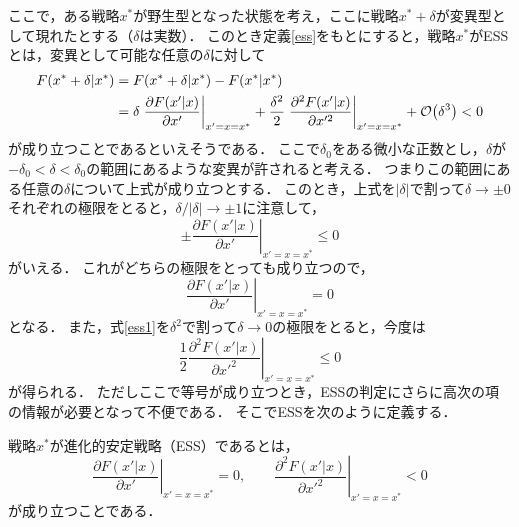 ここで，ある戦略$x^*$が野生型となった状態を考え，ここに戦略$x^*+\delta$が変異型として現れたとする（$\delta$は実数）．
このとき定義\ref{ess}をもとにすると，戦略$x^*$がESSとは，変異として可能な任意の$\delta$に対して
\begin{align}
  F(x^*+\delta|x^*) &= F(x^*+\delta | x^*) - F(x^*|x^*) \notag\\
  &= \delta\left.\frac{\partial F(x'|x)}{\partial x'}\right|_{x'=x=x^*} + \frac{\delta^2}{2}\left.\frac{\partial^2 F(x'|x)}{\partial x'^2}\right|_{x'=x=x^*} + \order{\delta^3} < 0 \label{ess1}
\end{align}
が成り立つことであるといえそうである．
ここで$\delta_0$をある微小な正数とし，$\delta$が$-\delta_0 < \delta < \delta_0$の範囲にあるような変異が許されると考える．
つまりこの範囲にある任意の$\delta$について上式が成り立つとする．
このとき，上式を$\lvert \delta \rvert$で割って$\delta \to \pm 0$それぞれの極限をとると，$\delta/\lvert\delta\rvert \to \pm 1$に注意して，
\begin{equation}
  \pm \left.\frac{\partial F(x'|x)}{\partial x'}\right|_{x'=x=x^*} \le 0 
\end{equation}
がいえる．
これがどちらの極限をとっても成り立つので，
\begin{equation}
  \left.\frac{\partial F(x'|x)}{\partial x'}\right|_{x'=x=x^*} = 0
\end{equation}
となる．
また，式\eqref{ess1}を$\delta^2$で割って$\delta \to 0$の極限をとると，今度は
\begin{equation}
  \frac{1}{2}\left.\frac{\partial^2 F(x'|x)}{\partial x'^2}\right|_{x'=x=x^*} \le 0
\end{equation}
が得られる．
ただしここで等号が成り立つとき，ESSの判定にさらに高次の項の情報が必要となって不便である．
そこでESSを次のように定義する．
\begin{dfn}[漸進進化における進化的安定戦略]
  戦略$x^*$が進化的安定戦略（ESS）であるとは，
  \begin{equation}
    \left.\frac{\partial F(x'|x)}{\partial x'}\right|_{x'=x=x^*}=0 ,\qquad \left.\frac{\partial^2 F(x'|x)}{\partial x'^2}\right|_{x'=x=x^*} < 0 
  \end{equation}
  が成り立つことである．
\end{dfn}

